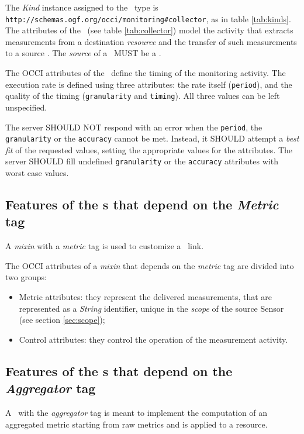 \documentclass[10pt,a4paper]{article}
\begin{document}
The {\em Kind} instance assigned to the \coll\ type is {\tt http://schemas.ogf.org/occi/monitoring\#collector}, as in table \ref{tab:kinds}. The attributes of the \coll\ (see table \ref{tab:collector}) model the activity that extracts measurements from a destination {\em resource} and the transfer of such measurements to a source \sens. The {\em source} of a \coll\ MUST be a \sens.

The OCCI attributes of the \coll\ define the timing of the monitoring activity.
The execution rate is defined using three attributes: the rate itself (\verb|period|), and the quality of the timing ({\tt granularity} and {\tt timing}). All three values can be left unspecified.

The server SHOULD NOT respond with an error when the {\tt period}, the {\tt granularity} or the {\tt accuracy} cannot be met. Instead, it SHOULD attempt a {\em best fit} of the requested values, setting the appropriate values for the attributes. The server SHOULD fill undefined {\tt granularity} or the {\tt accuracy} attributes with worst case values. 

\subsection{Features of the \mi s that depend on the {\em Metric} tag \label{sec:metric}}

A {\em mixin} with a {\em metric} tag is used to customize a \coll\ link.

The OCCI attributes of a {\em mixin} that depends on the {\em metric} tag are divided into two groups:
\begin{itemize}

\item Metric attributes: they represent the delivered measurements, that are represented as a {\em String} identifier, unique in the {\em scope} of the source Sensor (see section \ref{sec:scope});
\item Control attributes: they control the operation of the measurement activity.
\end{itemize}

\subsection{Features of the \mi s that depend on the {\em Aggregator} tag \label{sec:aggregator}}

A \mi\ with the {\em aggregator} tag is meant to implement the computation of an aggregated metric starting from raw metrics and is applied to a \sens resource.
\end{document}
